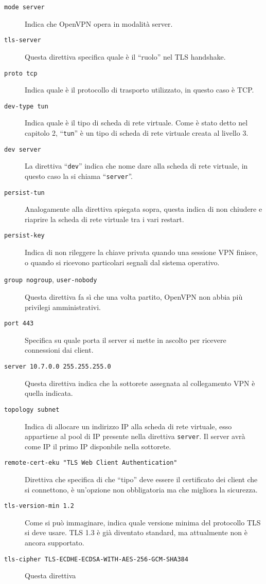 \begin{description}
	\item[\texttt{mode server}]Indica che OpenVPN opera in modalità server.
	\item[\texttt{tls-server}]Questa direttiva specifica quale è il ``ruolo'' nel TLS
	handshake.
	\item[\texttt{proto tcp}]Indica quale è il protocollo di trasporto utilizzato,
	in questo caso è TCP.
	\item[\texttt{dev-type tun}]Indica quale è il tipo di scheda di rete virtuale.
	Come è stato detto nel capitolo 2, ``\texttt{tun}'' è un tipo di scheda di rete
	virtuale creata al livello 3.
	\item[\texttt{dev server}]La direttiva ``\texttt{dev}'' indica che nome dare
	alla scheda di rete virtuale, in questo caso la si chiama ``\texttt{server}''.
	\item[\texttt{persist-tun}]Analogamente alla direttiva spiegata sopra, questa
	indica di non chiudere e riaprire la scheda di rete virtuale tra i vari restart.
	\item[\texttt{persist-key}]Indica di non rileggere la chiave privata quando una
	sessione VPN finisce, o quando si ricevono particolari segnali dal sistema operativo.
	\item[\texttt{group nogroup}, \texttt{user-nobody}]Questa direttiva fa
	sì che una volta partito, OpenVPN
	non abbia più privilegi amministrativi.
	\item[\texttt{port 443}]Specifica su quale porta il server si mette in ascolto per
	ricevere connessioni dai client.
	\item[\texttt{server 10.7.0.0 255.255.255.0}]Questa direttiva indica che la sottorete
	assegnata al collegamento VPN è quella indicata.
	\item[\texttt{topology subnet}]Indica di allocare un indirizzo IP alla scheda
	di rete virtuale, esso appartiene al pool di IP presente nella direttiva \texttt{server}.
	Il server avrà come IP il primo IP disponbile nella sottorete.
	\item[\texttt{remote-cert-eku "TLS Web Client Authentication"}]Direttiva che specifica
	di che ``tipo'' deve essere il certificato dei client che si connettono, è un'opzione
	non obbligatoria ma che migliora la sicurezza.
	\item[\texttt{tls-version-min 1.2}]Come si può immaginare, indica quale versione minima
	del protocollo TLS si deve usare. TLS 1.3 è già diventato standard, ma attualmente
	non è ancora supportato.
	\item[\texttt{tls-cipher TLS-ECDHE-ECDSA-WITH-AES-256-GCM-SHA384}]Questa direttiva

\end{description}
